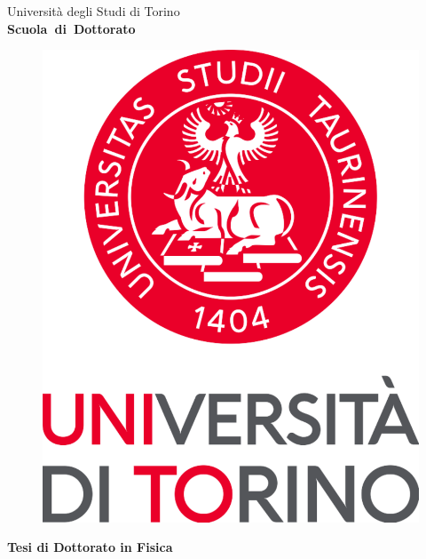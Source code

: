 \begin{titlepage}

\begin{center}
\begin{large}
Universit\`a degli Studi di Torino \\
{\bf Scuola~di~Dottorato}
\end{large}
\end{center}
\hrulefill

\vspace{0.5cm}
\begin{figure}[h]
  \centering
  \includegraphics[width=.2\textheight]{Figures/logoUniversita.pdf}
\end{figure}

\vspace{1cm}
\begin{center}
{\Large \bf Tesi di Dottorato in Fisica}
\end{center}

\vspace{1cm}
\begin{center}
  {\LARGE \bf \thetitle}\\
  \vspace{1cm}
         {\Large \bf \theauthor}
\end{center}

\vspace*{\fill}


\vspace{1cm}
\end{titlepage}
